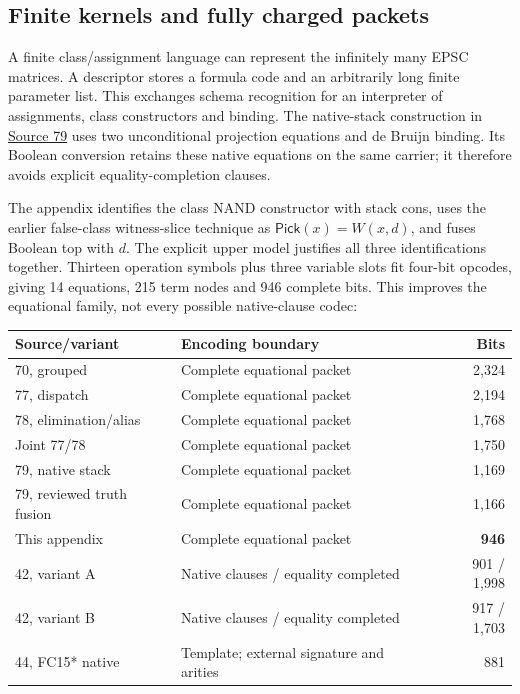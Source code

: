 \subsection{Finite kernels and fully charged packets}

A finite class/assignment language can represent the infinitely many EPSC
matrices. A descriptor stores a formula code and an arbitrarily long finite
parameter list. This exchanges schema recognition for an interpreter of
assignments, class constructors and binding. The native-stack construction
in
\href{https://github.com/VladimirReshetnikov/ProveIt/blob/13ec39ed43148b1807f51ed6e6528e1c84659562/SetTheory/Cardinals/docs/reports/set-theory/zfc-closure-kernels/code/79-zb242-res-stack-kernel-stack_kernel_note.tex}{Source 79}
uses two unconditional projection equations and de Bruijn binding.
Its Boolean conversion retains these native equations on the same carrier;
it therefore avoids explicit equality-completion clauses.

The appendix identifies the class NAND constructor with stack cons,
uses the earlier false-class witness-slice technique as
$\mathsf{Pick}(x)=W(x,d)$, and fuses Boolean top with $d$.
The explicit upper model justifies all three identifications together.
Thirteen operation symbols plus three variable slots fit four-bit opcodes,
giving 14 equations, 215 term nodes and 946 complete bits. This improves the
equational family, not every possible native-clause codec:

\begin{center}
\small
\begin{tabular}{@{}llr@{}}
\toprule
Source/variant & Encoding boundary & Bits\\
\midrule
70, grouped & Complete equational packet & 2,324\\
77, dispatch & Complete equational packet & 2,194\\
78, elimination/alias & Complete equational packet & 1,768\\
Joint 77/78 & Complete equational packet & 1,750\\
79, native stack & Complete equational packet & 1,169\\
79, reviewed truth fusion & Complete equational packet & 1,166\\
This appendix & Complete equational packet & \textbf{946}\\
42, variant A & Native clauses / equality completed & 901 / 1,998\\
42, variant B & Native clauses / equality completed & 917 / 1,703\\
44, FC15* native & Template; external signature and arities & 881\\
\bottomrule
\end{tabular}
\end{center}

